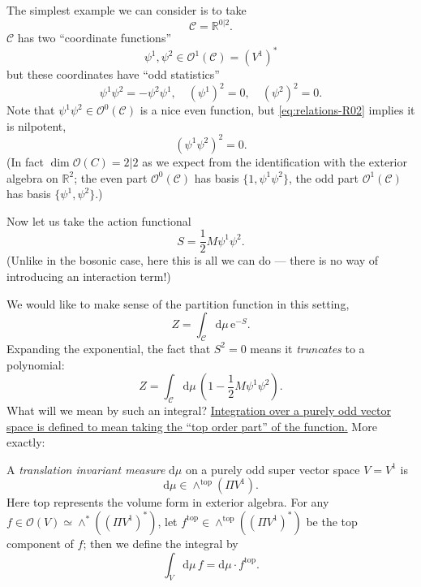 \documentclass[12pt,letterpaper,reqno]{article}
\numberwithin{equation}{section}
\newcommand{\cC}{\ensuremath{\mathcal C}}
\newcommand{\cO}{\ensuremath{\mathcal O}}
\newcommand{\R}{\ensuremath{\mathbb R}}
\newcommand{\half}{\ensuremath{\frac{1}{2}}}
\newcommand{\e}{{\mathrm e}}
\newcommand{\de}{\mathrm{d}}
\newcommand{\rmtop}{\mathrm{top}}
\newcommand{\ti}[1]{\textit{#1}}
\begin{document}
The simplest example we can consider is to take
\begin{equation}
  \cC = \R^{0 \vert 2}.
\end{equation}
$\cC$ has two ``coordinate functions''
\begin{equation}
  \psi^1, \psi^2 \in \cO^1(\cC) = (V^1)^*
\end{equation}
but these coordinates have ``odd statistics''
\begin{equation} \label{eq:relations-R02}
  \psi^1 \psi^2 = -\psi^2 \psi^1, \quad (\psi^1)^2 = 0, \quad (\psi^2)^2 = 0.
\end{equation}
Note that $\psi^1 \psi^2 \in \cO^0(\cC)$ is a nice even function,
but \eqref{eq:relations-R02} implies it is nilpotent,
\begin{equation}
  (\psi^1 \psi^2)^2 = 0.
\end{equation}
(In fact $\dim \cO(C) = 2 \vert 2$ as we expect from the identification
with the exterior algebra on $\R^2$; the even part $\cO^0(\cC)$ has basis
$\{1, \psi^1 \psi^2\}$, the odd part $\cO^1(\cC)$ has basis $\{\psi^1, \psi^2\}$.)

Now let us take the action functional
\begin{equation}
  S = \half M \psi^1 \psi^2.
\end{equation}
(Unlike in the bosonic case, here this is all we can do --- there is no 
way of introducing an interaction term!)

We would like to make sense of the partition function in this setting,
\begin{equation} \label{eq:2-fermion-partition-function}
  Z = \int_\cC \de\mu \, \e^{-S}.
\end{equation}
Expanding the exponential, the fact that $S^2 = 0$ means it \ti{truncates} to a polynomial:
\begin{equation} \label{eq:2-fermion-partition-function-expanded}
  Z = \int_\cC \de \mu \, \left(1 - \half M \psi^1 \psi^2\right).
\end{equation}
What will we mean by such an integral?
\ul{Integration over a purely odd vector space is defined to mean taking the
``top order part'' of the function.}
More exactly: 

\begin{defn} \label{defn:odd-integral} A \ti{translation invariant measure} $\de \mu$ 
on a purely odd super vector space $V = V^1$
is
\begin{equation} \label{eq:measure-odd-vector-space}
  \de \mu \in \wedge^\rmtop(\Pi V^1).
\end{equation}
Here top represents the volume form in exterior algebra.
For any $f \in \cO(V) \simeq \wedge^*((\Pi V^1)^*)$, let
$f^\rmtop \in \wedge^\rmtop((\Pi V^1)^*)$ be the top component of $f$; then
we define the integral by
\begin{equation}
  \int_V \de \mu \, f = \de\mu \cdot f^\rmtop.
\end{equation}
\end{defn}
\end{document}
